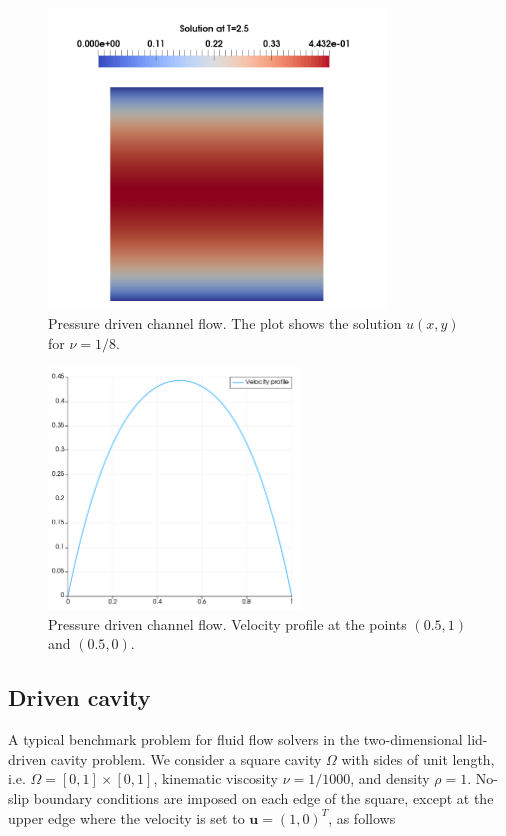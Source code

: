 \documentclass[11pt,a4paper,titlepage]{report}
\begin{document}
\begin{figure}[h!]
\centering
\includegraphics[width=0.8\textwidth]{images/velocity_solution.png}
\caption{Pressure driven channel flow. The plot shows the solution $u(x,y)$ for $\nu = 1/8$.}
\end{figure}

\begin{figure}[h!]
\centering
\includegraphics[width=0.6\textwidth]{images/velocity_profile.pdf}
\caption{Pressure driven channel flow. Velocity profile at the points $(0.5, 1)$ and $(0.5, 0)$.}
\end{figure}

\subsection{Driven cavity}

A typical benchmark problem for fluid flow solvers in the two-dimensional lid-driven cavity problem. We consider a square cavity $\Omega$ with sides of unit length, i.e. $\Omega = [0,1] \times [0,1]$, kinematic viscosity $\nu = 1/1000$, and density $\rho = 1$. No-slip boundary conditions are imposed on each edge of the square, except at the upper edge where the velocity is set to $\mathbf{u} = (1,0)^T$, as follows
\end{document}
